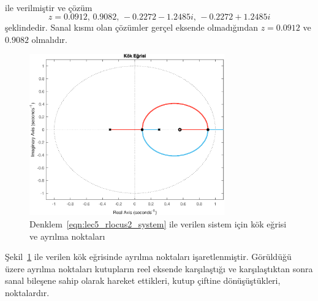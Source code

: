 \begin{enumerate}
\begin{gather*}
    \end{gather*}
    ile verilmiştir ve çözüm 
    \begin{equation}
        z=0.0912,\,0.9082,\,-0.2272 - 1.2485i,\,-0.2272 + 1.2485i
    \end{equation}
    şeklindedir. Sanal kısmı olan çözümler gerçel eksende olmadığından $z=0.0912$ ve $0.9082$ olmalıdır.
    \begin{figure}[!htb]
        \centering
        \includegraphics[width=0.75\textwidth]{img/lec5_rlocus3}
        \caption{Denklem~\ref{eqn:lec5_rlocus2_system} ile verilen sistem için kök eğrisi ve ayrılma noktaları}
        \label{fig:lec5_rlocus3}
    \end{figure}
    Şekil~\ref{fig:lec5_rlocus3} ile verilen kök eğrisinde ayrılma noktaları işaretlenmiştir. Görüldüğü üzere ayrılma noktaları kutupların reel eksende karşılaştığı ve karşılaştıktan sonra sanal bileşene sahip olarak hareket ettikleri, kutup çiftine dönüşüştükleri, noktalardır.
\end{enumerate}